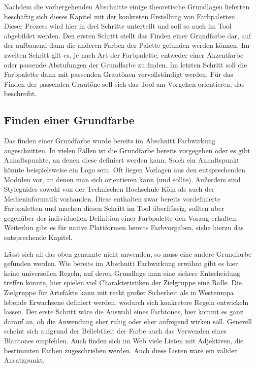 Nachdem die vorhergehenden Abschnitte einige theoretische Grundlagen lieferten beschäftig sich dieses Kapitel mit der konkreten Erstellung von Farbpaletten. Dieser Prozess wird hier in drei Schritte unterteilt und soll so auch im Tool abgebildet werden.
Den ersten Schritt stellt das Finden einer Grundfarbe dar, auf der aufbauend dann die anderen Farben der Palette gefunden werden können.
Im zweiten Schritt gilt es, je nach Art der Farbpalette, entweder einer Akzentfarbe oder passende Abstufungen der Grundfarbe zu finden. Im letzten Schritt soll die Farbpalette dann mit passenden Grautönen vervollständigt werden. Für das Finden der passenden Grautöne soll sich das Tool am Vorgehen orientieren, das \cite{elizabeth2016simple} beschreibt.

\subsection{Finden einer Grundfarbe}

Das finden einer Grundfarbe wurde bereits im Abschnitt Farbwirkung angeschnitten. In vielen Fällen ist die Grundfarbe bereits vorgegeben oder es gibt Anhaltspunkte, an denen diese definiert werden kann. Solch ein Anhaltspunkt könnte beispielsweise ein Logo sein.
Oft liegen Vorlagen aus den entsprechenden Modulen vor, an denen man sich orientieren kann (und sollte). Außerdem sind Styleguides sowohl von der Technischen Hochschule Köln als  auch der Medieninformatik vorhanden. Diese enthalten zwar bereits vordefinierte Farbpaletten und machen diesen Schritt im Tool überflüssig, sollten aber gegenüber der individuellen Definition einer Farbpalette den Vorzug erhalten. Weiterhin gibt es für native Plattformen bereits Farbvorgaben, siehe hierzu das entsprechende Kapitel.

Lässt sich all das oben genannte nicht anwenden, so muss eine andere Grundfarbe gefunden werden. Wie bereits im Abschnitt Farbwirkung erwähnt gibt es hier keine universellen Regeln, auf deren Grundlage man eine sichere Entscheidung treffen könnte, hier spielen viel Charakteristiken der Zielgruppe eine Rolle. Die Zielgruppe für Artefakte kann mit recht großer Sicherheit als in Westeuropa lebende Erwachsene definiert werden, wodurch sich konkretere Regeln entwickeln lassen.
Der erste Schritt wäre die Auswahl eines Farbtones, hier kommt es ganz darauf an, ob die Anwendung eher ruhig oder eher aufregend wirken soll. Generell scheint sich aufgrund der Beliebtheit der Farbe auch das Verwenden eines Blautones empfehlen.
Auch finden sich im Web viele Listen mit Adjektiven, die bestimmten Farben zugeschrieben werden. Auch diese Listen wäre ein valider Ansatzpunkt.


